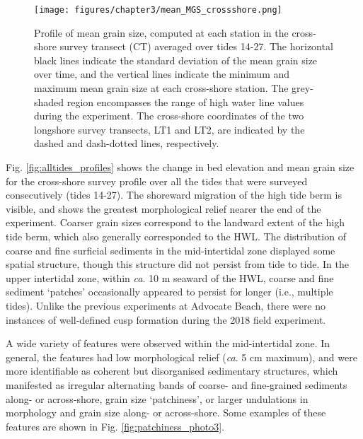 \begin{figure}[tbp] %
	\begin{center}
  	\texttt{[image: figures/chapter3/mean\_MGS\_crossshore.png]}
 	\caption[Cross-shore profile of mean grain size]{Profile of mean grain size, computed at each station in the cross-shore survey transect (CT) averaged over tides 14-27. The horizontal black lines indicate the standard deviation of the mean grain size over time, and the vertical lines indicate the minimum and maximum mean grain size at each cross-shore station. The grey-shaded region encompasses the range of high water line values during the experiment. The cross-shore coordinates of the two longshore survey transects, LT1 and LT2, are indicated by the dashed and dash-dotted lines, respectively. \label{fig:mean_MGS_profile}}
 	\end{center}
\end{figure}

Fig. \ref{fig:alltides_profiles} shows the change in bed elevation and mean grain size for the cross-shore survey profile over all the tides that were surveyed consecutively (tides 14-27). The shoreward migration of the high tide berm is visible, and shows the greatest morphological relief nearer the end of the experiment. Coarser grain sizes correspond to the landward extent of the high tide berm, which also generally corresponded to the HWL. The distribution of coarse and fine surficial sediments in the mid-intertidal zone displayed some spatial structure, though this structure did not persist from tide to tide. In the upper intertidal zone, within \textit{ca}. 10 m seaward of the HWL, coarse and fine sediment `patches' occasionally appeared to persist for longer (i.e., multiple tides). Unlike the previous experiments at Advocate Beach, there were no instances of well-defined cusp formation during the 2018 field experiment. 

A wide variety of features were observed within the mid-intertidal zone. In general, the features had low morphological relief (\textit{ca}. 5 cm maximum), and were more identifiable as coherent but disorganised sedimentary structures, which manifested as irregular alternating bands of coarse- and fine-grained sediments along- or across-shore, grain size `patchiness', or larger undulations in morphology and grain size along- or across-shore. Some examples of these features are shown in Fig. \ref{fig:patchiness_photo3}.


